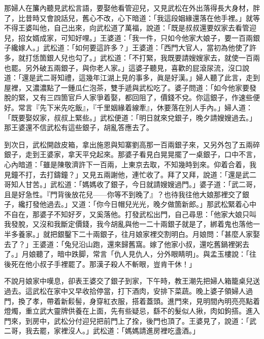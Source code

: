那婦人在簾內聽見武松言語，要娶他看管迎兒，又見武松在外出落得長大身材，胖了，比昔時又會說話兒，舊心不改，心下暗道：「我這段姻緣還落在他手裡。」就等不得王婆叫他，{}自己出來，向武松道了萬福，說道：「既是叔叔還要奴家去看管迎兒，招女婿成家，可知好哩。」王婆道：「我一件，只如今他家大娘子，要一百兩銀子纔嫁人。」武松道：「如何要這許多？」王婆道：「西門大官人，當初為他使了許多，就打恁箇銀人兒也勾了。」武松道：「不打緊，我既要請嫂嫂家去，就使一百兩也罷。另外破五兩銀子，與你老人家。」這婆子聽見，喜歡的屁滾尿流，沒口說道：「還是武二哥知禮，這幾年江湖上見的事多，眞是好漢。」婦人聽了此言，走到屋裡，又濃濃點了一鍾瓜仁泡茶，雙手遞與武松吃了。婆子問道：「如今他家要發脫的緊，又有三四箇官戶人家爭着娶，都回阻了，價錢不兌。你這銀子，作速些便好。常言『先下米先吃飯』，『千里姻緣着線牽』，休要落在別人手內。」婦人道：「既要娶奴家，叔叔上緊些。」{}武松便道：「明日就來兌銀子，晚夕請嫂嫂過去。」那王婆還不信武松有這些銀子，胡亂答應去了。

到次日，武松開啟皮箱，拿出施恩與知寨劉高那一百兩銀子來，又另外包了五兩碎銀子，走到王婆家，拿天平兌起來。那婆子看見白晃晃擺了一桌銀子，口中不言，心內暗道：「雖是陳敬濟許下一百兩，上東京去取，不知幾時到來。仰着合着，我見鐘不打，去打鑄鐘？」又見五兩謝他，連忙收了。拜了又拜，說道：「還是武二哥知人甘苦。」武松道：「媽媽收了銀子，今日就請嫂嫂過門。」婆子道：「武二哥，且是好急性。『門背後放花兒——你等不到晚了』？{}也待我往他大娘那裡交了銀子，纔打發他過去。」又道：「你今日帽兒光光，晚夕做箇新郎。」那武松緊着心中不自在，那婆子不知好歹，又奚落他。打發武松出門，自己尋思：「他家大娘只叫我發脫，又沒和我斷定價錢，我今胡亂與他一二十兩銀子就是了，綁着鬼也落他一半多養家。」就把銀鑿下二十兩銀子，往月娘家裡交割明白。月娘問：「甚麼人家娶去了？」王婆道：「兔兒沿山跑，還來歸舊窩。嫁了他家小叔，還吃舊鍋裡粥去了。」月娘聽了，暗中跌脚，常言「仇人見仇人，分外眼睛明」。與孟玉樓說：「往後死在他小叔子手裡罷了。{}那漢子殺人不斬眼，豈肯干休！」

不說月娘家中嘆息，卻表王婆交了銀子到家，下午時，教王潮先把婦人箱籠桌兒送過去。這武松在家中又早收拾停當，打下酒肉，安排下菜蔬。晚上婆子領婦人過門，換了孝，帶着新鬏髻，身穿紅衣服，搭着蓋頭。進門來，見明間內明亮亮點着燈燭，重立武大靈牌供養在上面，先有些疑忌，繇不的髮似人揪，肉如鉤搭。進入門來，到房中，武松分付迎兒把前門上了拴，後門也頂了。王婆見了，說道：「武二哥，我去罷，家裡沒人。」武松道：「媽媽請進房裡吃盞酒。」

